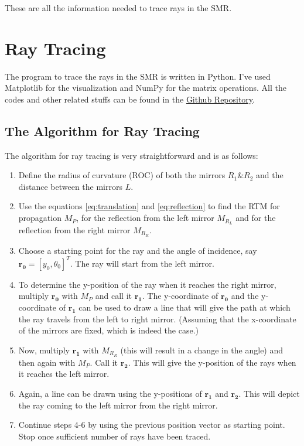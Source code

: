 \documentclass[12pt]{article}
\begin{document}
These are all the information needed to trace rays in the SMR.

\section{Ray Tracing}

The program to trace the rays in the SMR is written in Python. I've used {\color{cyan}Matplotlib}\cite{matplotlib} for the visualization and {\color{cyan}NumPy}\cite{numpy} for the matrix operations. All the codes and other related stuffs can be found in the \href{https://github.com/Hari31416/Laser-Term-Paper}{Github Repository}\cite{git-repo}.

\subsection{The Algorithm for Ray Tracing}
The algorithm for ray tracing is very straightforward and is as follows:
\begin{enumerate}
    \item Define the radius of curvature (ROC) of both the mirrors \(R_1 \& R_2\) and the distance between the mirrors \(L\).
    \item Use the equations \ref{eq:translation} and \ref{eq:reflection} to find the RTM for propagation \(M_P\), for the reflection from the left mirror \(M_{R_L}\) and for the reflection from the right mirror \(M_{R_R}\).
    \item Choose a starting point for the ray and the angle of incidence, say \(\mathbf{r_0} = [y_0, \theta_0]^T\). The ray will start from the left mirror.
    \item To determine the y-position of the ray when it reaches the right mirror, multiply \(\mathbf{r_0}\) with \(M_P\) and call it \(\mathbf{r_1}\). The y-coordinate of \(\mathbf{r_0}\) and the y-coordinate of \(\mathbf{r_1}\) can be used to draw a line that will give the path at which the ray travels from the left to right mirror. (Assuming that the x-coordinate of the mirrors are fixed, which is indeed the case.)
    \item Now, multiply \(\mathbf{r_1}\) with \(M_{R_R}\) (this will result in a change in the angle) and then again with \(M_P\). Call it \(\mathbf{r_2}\). This will give the y-position of the rays when it reaches the left mirror.
    \item Again, a line can be drawn using the y-positions of \(\mathbf{r_1}\) and \(\mathbf{r_2}\). This will depict the ray coming to the left mirror from the right mirror.
    \item Continue steps 4-6 by using the previous position vector as starting point. Stop once sufficient number of rays have been traced.
\end{enumerate}
\end{document}
